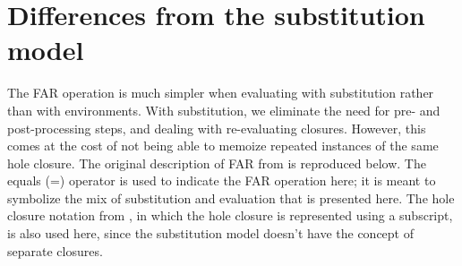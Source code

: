 \section{Differences from the substitution model}
\label{sec:far-sub}

The FAR operation is much simpler when evaluating with substitution rather than with environments. With substitution, we eliminate the need for pre- and post-processing steps, and dealing with re-evaluating closures. However, this comes at the cost of not being able to memoize repeated instances of the same hole closure. The original description of FAR from \cite{conf/popl/HazelnutLive19} is reproduced below. The equals (=) operator is used to indicate the FAR operation here; it is meant to symbolize the mix of substitution and evaluation that is presented here. The hole closure notation from \cite{conf/popl/HazelnutLive19}, in which the hole closure is represented using a subscript, is also used here, since the substitution model doesn't have the concept of separate closures.


\begin{singlespace}



\end{singlespace}

